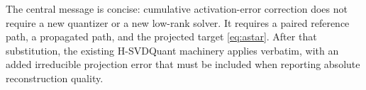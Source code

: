 \documentclass[11pt]{article}
\begin{document}
The central message is concise: cumulative activation-error correction does not
require a new quantizer or a new low-rank solver.  It requires a paired reference
path, a propagated path, and the projected target \eqref{eq:astar}.  After that
substitution, the existing H-SVDQuant machinery applies verbatim, with an added
irreducible projection error that must be included when reporting absolute
reconstruction quality.
\end{document}

